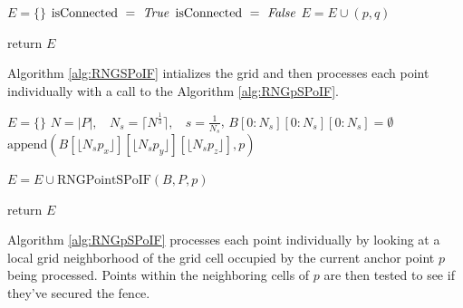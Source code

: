 \documentclass[a4paper,fleqn]{cas-dc}
\begin{document}
\begin{algorithm}
  \caption{Single point naive Relative Neighborhood Graph for the list $Q$ to test for connections to $p$}\label{alg:RNGPointNaive}
  \begin{algorithmic}[1]
      \State $E = \{\}$
        \State $\text{isConnected } = \text{ \emph{True}}$
            \State $\text{isConnected } = \text{ \emph{False}}$
          \EndIf
        \EndFor
          \State $E = E \cup (p,q)$
        \EndIf
      \EndFor

      \State $\text{return } E$
    \EndProcedure
  \end{algorithmic}
\end{algorithm}

Algorithm \ref{alg:RNGSPoIF} intializes the grid and then processes
each point individually with a call to the Algorithm \ref{alg:RNGpSPoIF}.

\begin{algorithm}
  \caption{Relative Neighborhood Graph, Secure Posts on Increasing Fence (SPoIF)}\label{alg:RNGSPoIF}
  \begin{algorithmic}[1]
    \State \vspace{0.5em} $E = \{\}$
    \State \vspace{0.5em} $N = |P|, \ \ \ \ N_s = \lceil N^{\frac{1}{3}} \rceil, \ \ \ \ s = \frac{1}{N_s}$,
    \State \vspace{0.5em} $B[0:N_s][0:N_s][0:N_s] = \emptyset$
      \vspace{0.5em} \State $\text{append}( B[ \lfloor N_s  p_x \rfloor ][ \lfloor N_s  p_y \rfloor ][ \lfloor N_s  p_z \rfloor ] , p )$
    \EndFor

      \vspace{0.5em} \State $E = E \cup \text{RNGPointSPoIF}(B,P,p)$
    \EndFor

    \State $\text{return } E$

    \EndProcedure
  \end{algorithmic}
\end{algorithm}

Algorithm \ref{alg:RNGpSPoIF} processes each point individually by
looking at a local grid neighborhood of the grid cell occupied by the current
anchor point $p$ being processed.
Points within the neighboring cells of $p$
are then tested to see if they've secured the fence.
\end{document}
